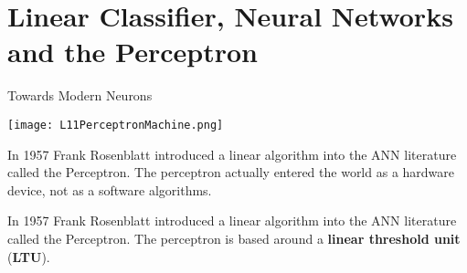 \documentclass[10pt, table, dvipsnames,xcdraw, handout]{beamer}
\begin{document}
\section{Linear Classifier, Neural Networks and the Perceptron}






\begin{frame}[fragile]{Towards Modern Neurons}
  \begin{minipage}[t][0.5\textheight][t]{\textwidth}
  \centering \texttt{[image: L11PerceptronMachine.png]} 
  \end{minipage}
  \vfill
\begin{minipage}[t][0.5\textheight][t]{\textwidth}
In 1957 Frank Rosenblatt introduced a linear algorithm into the ANN literature called the Perceptron.  The perceptron actually entered the world as a hardware device, not as a software algorithms.\newline \pause

In 1957 Frank Rosenblatt introduced a linear algorithm into the ANN literature called the Perceptron.  The perceptron is based around a \textbf{linear threshold unit} (\textbf{LTU}).
\end{minipage}
\end{frame}
\end{document}
